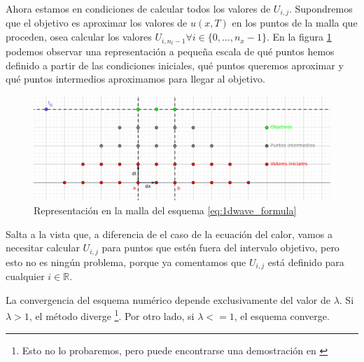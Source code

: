 Ahora estamos en condiciones de calcular todos los valores de $U_{i,j}$. Supondremos que el objetivo es aproximar los valores de $u(x,T)$ en los puntos de la malla que proceden, osea calcular los valores $U_{i,n_t-1} \forall i\in \{0,\dots,n_x-1\}$. En la figura \ref{fig:1dwave_points} podemos observar una representación a pequeña escala de qué puntos hemos definido a partir de las condiciones iniciales, qué puntos queremos aproximar y qué puntos intermedios aproximamos para llegar al objetivo.
\begin{figure}[h]
	\centering
	\includegraphics[width=\linewidth]{./Imagenes/Bitmap/1dwavepoints.png}
	\caption{Representación en la malla del esquema \eqref{eq:1dwave_formula}}
	\label{fig:1dwave_points}
\end{figure}

Salta a la vista que, a diferencia de el caso de la ecuación del calor, vamos a necesitar calcular $U_{i,j}$ para puntos que estén fuera del intervalo objetivo, pero esto no es ningún problema, porque ya comentamos que $U_{i,j}$ está definido para cualquier $i\in\mathbb{R}$.

La convergencia del esquema numérico depende exclusivamente del valor de $\lambda$. Si $\lambda > 1$, el método diverge \footnote{Esto no lo probaremos, pero puede encontrarse una demostración en \cite[ p. 487.]{anummeth}}. Por otro lado, si $\lambda <=1$, el esquema converge.

